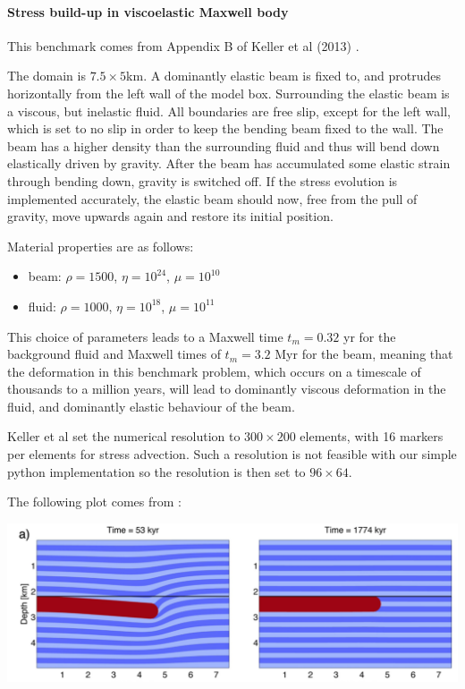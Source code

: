 \newpage
\paragraph{Stress build-up in viscoelastic Maxwell body}

This benchmark comes from Appendix B of Keller et al (2013) \cite{kemk13}.

The domain is $7.5\times5$km. A dominantly elastic beam is fixed to, and protrudes horizontally 
from the left wall of the model box. 
Surrounding the elastic beam is a viscous, but inelastic fluid. 
All boundaries are free slip, except for the left wall, which is set to no slip in 
order to keep the bending beam fixed to the wall. The beam has a higher density than the surrounding fluid and
thus will bend down elastically driven by gravity. After the beam has 
accumulated some elastic strain through bending down, gravity is switched off. 
If the stress evolution is implemented accurately, the elastic beam should now, 
free from the pull of gravity, move upwards again and restore its initial position. 

Material properties are as follows:
\begin{itemize}
\item beam: $\rho=1500$, $\eta=10^{24}$, $\mu=10^{10}$
\item fluid: $\rho=1000$, $\eta=10^{18}$, $\mu=10^{11}$
\end{itemize}

This choice of parameters leads to a Maxwell time 
$t_m = 0.32$ yr for the background fluid and Maxwell times of 
$t_m = 3.2$ Myr for the beam, meaning that the deformation in this benchmark problem, 
which occurs on a timescale of thousands to a million years, 
will lead to dominantly viscous deformation in the fluid, 
and dominantly elastic behaviour of the beam. 

Keller et al set the numerical resolution to $300\times200$ elements, 
with 16 markers per elements for stress advection. Such a resolution is 
not feasible with our simple python implementation so the resolution is
then set to $96\times64$. 

The following plot comes from \cite{kemk13}:
\begin{center}
\includegraphics[width=14cm]{python_codes/fieldstone_64/images/kemk13}
\end{center}

